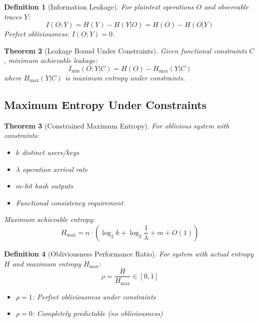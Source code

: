 \documentclass[11pt,final]{article}
\newtheorem{theorem}{Theorem}[section]
\newtheorem{definition}[theorem]{Definition}
\begin{document}
\begin{definition}[Information Leakage]
For plaintext operations $O$ and observable traces $Y$:
\begin{equation}
I(O; Y) = H(Y) - H(Y|O) = H(O) - H(O|Y)
\end{equation}
Perfect obliviousness: $I(O; Y) = 0$.
\end{definition}

\begin{theorem}[Leakage Bound Under Constraints]
Given functional constraints $C$, minimum achievable leakage:
\begin{equation}
I_{\min}(O; Y | C) = H(O) - H_{\max}(Y | C)
\end{equation}
where $H_{\max}(Y | C)$ is maximum entropy under constraints.
\end{theorem}

\subsection{Maximum Entropy Under Constraints}

\begin{theorem}[Constrained Maximum Entropy]
For oblivious system with constraints:
\begin{itemize}
    \item $k$ distinct users/keys
    \item $\lambda$ operation arrival rate  
    \item $m$-bit hash outputs
    \item Functional consistency requirement
\end{itemize}
Maximum achievable entropy:
\begin{equation}
H_{\max} = n \cdot \left(\log_2 k + \log_2 \frac{1}{\lambda} + m + O(1)\right)
\end{equation}
\end{theorem}

\begin{definition}[Obliviousness Performance Ratio]
For system with actual entropy $H$ and maximum entropy $H_{\max}$:
\begin{equation}
\rho = \frac{H}{H_{\max}} \in [0, 1]
\end{equation}
\begin{itemize}
    \item $\rho = 1$: Perfect obliviousness under constraints
    \item $\rho = 0$: Completely predictable (no obliviousness)
\end{itemize}
\end{definition}
\end{document}
